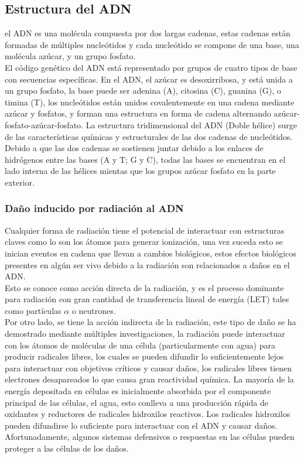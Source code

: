 \subsection{Estructura del ADN}
el ADN es una molécula compuesta por dos largas cadenas, estas cadenas están formadas de múltiples
nucleótidos y cada
nucleótido se compone de una base, una molécula azúcar, y un grupo fosfato.\\
El código genético del ADN está representado por grupos de cuatro tipos de base con secuencias específicas. En el ADN, el azúcar es desoxirribosa, y está unida a un grupo fosfato,  la base puede ser adenina (A), citosina (C), guanina (G), o timina (T), los nucleótidos están unidos covalentemente en una cadena mediante azúcar y fosfatos, y forman una estructura en forma de cadena alternando azúcar-fosfato-azúcar-fosfato. La estructura tridimensional del ADN (Doble hélice) surge de las características químicas y estructurales de las dos cadenas de nucleótidos. Debido a que las dos cadenas se sostienen juntar debido a los enlaces de hidrógenos entre las bases (A y T; G y C), todas las bases se encuentran en el lado interna de las hélices mientas que los grupos azúcar fosfato en la parte exterior\cite{rescells}.

\subsubsection{Daño inducido por radiación al ADN}

 Cualquier forma de radiación tiene el potencial de interactuar con estructuras claves como lo son los átomos para generar ionización, una vez suceda esto se inician eventos en cadena que llevan a cambios biológicos, estos efectos biológicos presentes en algún ser vivo debido a la radiación son relacionados a daños en el ADN.\\
 Esto se conoce como acción directa de la radiación, y es el proceso dominante para radiación con gran cantidad de transferencia lineal de energía (LET) tales como partículas $\alpha$ o neutrones\cite{rescells}.\\

Por otro lado, se tiene la acción indirecta de la radiación, este tipo de daño se ha demostrado mediante múltiples investigaciones\cite{willmari}, la radiación puede interactuar con los átomos de moléculas de una célula (particularmente con agua) para producir radicales libres, los cuales se pueden difundir lo suficientemente lejos para interactuar con objetivos críticos y causar daños, los radicales libres tienen electrones desapareados lo que causa gran reactividad química. La mayoría de la energía depositada en células es inicialmente absorbida por el componente principal de las células, el agua, esto conlleva a una producción rápida de oxidantes y reductores de radicales hidroxilos reactivos. Los radicales hidroxilos pueden difundirse lo suficiente para interactuar con el ADN y causar daños. Afortunadamente, algunos sistemas defensivos o respuestas en las células pueden proteger a las células de los daños\cite{rescells}.\\

